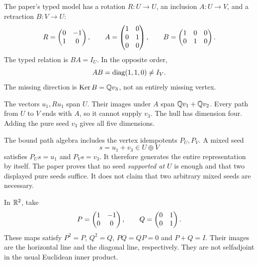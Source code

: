 
The paper's typed model has a rotation $R:U\to U$, an inclusion $A:U\to V$, and a retraction $B:V\to U$:
\[
R=\begin{pmatrix}0&-1\\1&0\end{pmatrix},\qquad
A=\begin{pmatrix}1&0\\0&1\\0&0\end{pmatrix},\qquad
B=\begin{pmatrix}1&0&0\\0&1&0\end{pmatrix}.
\]
The typed relation is $BA=I_U$. In the opposite order,
\[
AB=\operatorname{diag}(1,1,0)\ne I_V.
\]
The missing direction is $\operatorname{Ker} B=\mathbb Q v_3$, not an entirely missing vertex.


The vectors $u_1,Ru_1$ span $U$. Their images under $A$ span $\mathbb Q v_1+\mathbb Q v_2$. Every path from $U$ to $V$ ends with $A$, so it cannot supply $v_3$. The hull has dimension four. Adding the pure seed $v_3$ gives all five dimensions.

The bound path algebra includes the vertex idempotents $P_U,P_V$. A mixed seed
\[
s=u_1+v_3\in U\oplus V
\]
satisfies $P_Us=u_1$ and $P_Vs=v_3$. It therefore generates the entire representation by itself. The paper proves that no seed \emph{supported at $U$} is enough and that two displayed pure seeds suffice. It does not claim that two arbitrary mixed seeds are necessary.


In $\mathbb R^2$, take
\[
P=\begin{pmatrix}1&-1\\0&0\end{pmatrix},\qquad Q=\begin{pmatrix}0&1\\0&1\end{pmatrix}.
\]
These maps satisfy $P^2=P$, $Q^2=Q$, $PQ=QP=0$ and $P+Q=I$. Their images are the horizontal line and the diagonal line, respectively. They are not selfadjoint in the usual Euclidean inner product.

